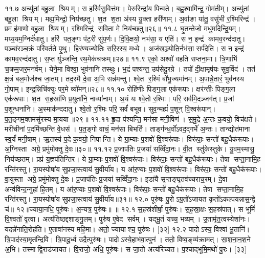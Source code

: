 ११.७
अच्यु॑तां बहु॒ला श्रियम्। स हरि॑र्वसु॒वित्त॑मः। पे॒रुरिन्द्रा॑य पिन्वते। ब॒ह्व॒श्वामि॑न्द्र॒ गोम॑तीम्। अच्यु॑तां बहु॒ला श्रियम्। मह्य॒मिन्द्रो॒ निय॑च्छतु। श॒त श॒ता अ॑स्य यु॒क्ता हरी॑णाम्। अ॒र्वाङा या॑तु॒ वसु॑भी र॒श्मिरिन्द्र॑। प्रमह॑माणो बहु॒ला श्रियम्। र॒श्मिरिन्द्र॑ सवि॒ता मे॒ निय॑च्छतु॥२६॥%
११.८
घृ॒तन्तेजो॒ मधु॑मदिन्द्रि॒यम्। मय्य॒यम॒ग्निर्द॑धातु। हरि॑ पत॒ङ्गः प॑ट॒री सु॑प॒र्णः। दि॒वि॒क्षयो॒ नभ॑सा॒ य एति॑। स न॒ इन्द्र॑ कामव॒रन्द॑दातु। पञ्चा॑रञ्च॒क्रं परि॑वर्तते पृ॒थु। हिर॑ण्यज्योतिः सरि॒रस्य॒ मध्ये। अज॑स्र॒ञ्ज्योति॒र्नभ॑सा॒ सर्प॑देति। स न॒ इन्द्र॑ कामव॒रन्द॑दातु। स॒प्त यु॑ञ्जन्ति॒ रथ॒मेक॑चक्रम्॥२७॥%
११.९
एको॒ अश्वो॑ वहति सप्तना॒मा। त्रि॒णाभि॑ च॒क्रम॒जर॒मन॑र्वम्। येने॒मा विश्वा॒ भुव॑नानि तस्थुः। भ॒द्रं पश्य॑न्त॒ उप॑सेदु॒रग्रे। तपो॑ दी॒क्षामृष॑यः सुव॒र्विद॑। तत॑ क्ष॒त्रं बल॒मोज॑श्च जा॒तम्। तद॒स्मै दे॒वा अ॒भि सन्न॑मन्तु। श्वे॒त र॒श्मिं बो॑भु॒ज्यमा॑नम्। अ॒पान्ने॒तारं॒ भुव॑नस्य गो॒पाम्। इन्द्र॒न्निचि॑क्युः पर॒मे व्यो॑मन्॥२८॥
११.१०
रोहि॑णीः पिङ्ग॒ला एक॑रूपाः। क्षर॑न्तीः पिङ्ग॒ला एक॑रूपाः। श॒त स॒हस्रा॑णि प्र॒युता॑नि॒ नाव्या॑नाम्। अ॒यं यः श्वे॒तो र॒श्मिः। परि॒ सर्व॑मि॒दञ्जग॑त्। प्र॒जां प॒शून्धना॑नि। अ॒स्माक॑न्ददातु। श्वे॒तो र॒श्मिः परि॒ सर्वं॑ बभूव। सुव॒न्मह्यं॑ प॒शून् वि॒श्वरू॑पान्। प॒त॒ङ्गम॒क्तमसु॑रस्य मा॒यया॥२९॥%
११.११
हृ॒दा प॑श्यन्ति॒ मन॑सा मनी॒षिण॑। स॒मु॒द्रे अ॒न्तः क॒वयो॒ विच॑क्षते। मरी॑चीनां प॒दमि॑च्छन्ति वे॒धस॑। प॒त॒ङ्गो वाचं॒ मन॑सा बिभर्ति। ताङ्ग॑न्ध॒र्वो॑ऽवद॒द्गर्भे॑ अ॒न्तः। तान्द्योत॑माना स्व॒र्यं॑ मनी॒षाम्। ऋ॒तस्य॑ प॒दे क॒वयो॒ निपान्ति। ये ग्रा॒म्याः प॒शवो॑ वि॒श्वरू॑पाः। विरू॑पाः॒ सन्तो॑ बहु॒धैक॑रूपाः। अ॒ग्निस्ता अग्रे॒ प्रमु॑मोक्तु दे॒वः॥३०॥
११.१२
प्र॒जाप॑तिः प्र॒जया॑ सव्विँदा॒नः। वी॒त स्तु॑केस्तुके। यु॒वम॒स्मासु॒ निय॑च्छतम्। प्रप्र॑ य॒ज्ञप॑तिन्तिर। ये ग्रा॒म्याः प॒शवो॑ वि॒श्वरू॑पाः। विरू॑पाः॒ सन्तो॑ बहु॒धैक॑रूपाः। तेषा सप्ता॒नामि॒ह रन्ति॑रस्तु। रा॒यस्पोषा॑य सुप्रजा॒स्त्वाय॑ सु॒वीर्या॑य। य आ॑र॒ण्याः प॒शवो॑ वि॒श्वरू॑पाः। विरू॑पाः॒ सन्तो॑ बहु॒धैक॑रूपाः। वा॒युस्ता अग्रे॒ प्रमु॑मोक्तु दे॒वः। प्र॒जाप॑तिः प्र॒जया॑ सव्विँदा॒नः। इडा॑यै सृ॒प्तङ्घृ॒तव॑च्चराच॒रम्। दे॒वा अन्व॑विन्द॒न्गुहा॑ हि॒तम्। य आ॑र॒ण्याः प॒शवो॑ वि॒श्वरू॑पाः। विरू॑पाः॒ सन्तो॑ बहु॒धैक॑रूपाः। तेषा सप्ता॒नामि॒ह रन्ति॑रस्तु। रा॒यस्पोषा॑य सुप्रजा॒स्त्वाय॑ सु॒वीर्या॑य॥३१॥
१२.०
पूरु॑षः पु॒रोऽग्र॒तो॑ऽजायत कृ॒तो॑ऽकल्पयन्नास॒न्द्वे च॑॥ १२॥ज्याया॒नधि॒ पूरु॑षः। अ॒न्यत्र॒ पुरु॑षः॥ ॥
\anuvakamend
१२.१
स॒हस्र॑शीर्\mbox{}षा॒ पुरु॑षः। स॒ह॒स्रा॒क्षः स॒हस्र॑पात्। स भूमिं॑ वि॒श्वतो॑ वृ॒त्वा। अत्य॑तिष्ठद्दशाङ्गु॒लम्। पुरु॑ष ए॒वेद सर्वम्। यद्भू॒तं यच्च॒ भव्यम्। उ॒तामृ॑त॒त्वस्येशा॑नः। यदन्ने॑नाति॒रोह॑ति। ए॒तावा॑नस्य महि॒मा। अतो॒ ज्यायाश्च॒ पूरु॑षः। [३२]
१२.२
पादोऽस्य॒ विश्वा॑ भू॒तानि॑। त्रि॒पाद॑स्या॒मृत॑न्दि॒वि। त्रि॒पादू॒र्ध्व उदै॒त्पुरु॑षः। पादोऽस्ये॒हाभ॑वा॒त्पुन॑। ततो॒ विष्व॒ङ्व्य॑क्रामत्। सा॒श॒ना॒न॒श॒ने अ॒भि। तस्माद्वि॒राड॑जायत। वि॒राजो॒ अधि॒ पूरु॑षः। स जा॒तो अत्य॑रिच्यत। प॒श्चाद्भूमि॒मथो॑ पु॒रः। [३३]
